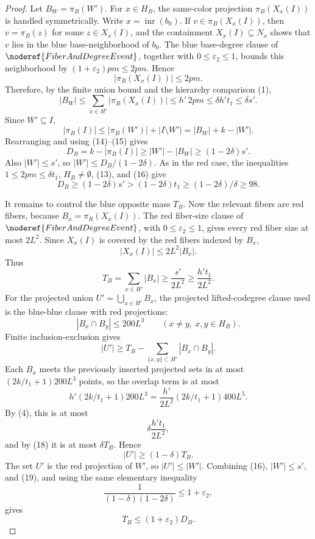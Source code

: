 \begin{proof}
Let \(B_W=\pi_B(W')\).  For \(x\in H_B\), the same-color projection
\(\pi_B(X_x(I))\) is handled symmetrically.  Write
\(x=\operatorname{inr}(b_0)\).  If \(v\in\pi_B(X_x(I))\), then
\(v=\pi_B(z)\) for some \(z\in X_x(I)\), and the containment
\(X_x(I)\subseteq N_x\) shows that \(v\) lies in the blue base-neighborhood
of \(b_0\).  The blue base-degree clause of
\(\noderef{FiberAndDegreeEvent}\), together with
\(0\le\varepsilon_2\le1\), bounds this neighborhood by
\((1+\varepsilon_2)pm\le2pm\).  Hence
\[
|\pi_B(X_x(I))|\le2pm. \tag{15a}
\]
Therefore, by the finite union bound and the hierarchy comparison (1),
\[
|B_W|
\le\sum_{x\in H'}|\pi_B(X_x(I))|
\le h'\,2pm
\le \delta h't_1
\le \delta s'. \tag{15}
\]
Since \(W'\subseteq I\),
\[
|\pi_B(I)|\le |\pi_B(W')|+|I\setminus W'|
  =|B_W|+k-|W'|.
\]
Rearranging and using (14)--(15) gives
\[
D_B=k-|\pi_B(I)|
\ge |W'|-|B_W|
\ge(1-2\delta)s'. \tag{16}
\]
Also \(|W'|\le s'\), so \(|W'|\le D_B/(1-2\delta)\).  As in the red case,
the inequalities \(1\le2pm\le\delta t_1\), \(H_B\ne\emptyset\), (13), and
(16) give
\[
D_B\ge(1-2\delta)s'>(1-2\delta)t_1
\ge(1-2\delta)/\delta\ge98. \tag{17}
\]

It remains to control the blue opposite mass \(T_B\).  Now the relevant
fibers are red fibers, because \(B_x=\pi_R(X_x(I))\).  The red fiber-size
clause of \(\noderef{FiberAndDegreeEvent}\), with
\(0\le\varepsilon_2\le1\), gives every red fiber size at most \(2L^2\).
Since \(X_x(I)\) is covered by the red fibers indexed by \(B_x\),
\[
|X_x(I)|\le2L^2|B_x|.
\]
Thus
\[
T_B=\sum_{x\in H'}|B_x|
\ge\frac{s'}{2L^2}\ge\frac{h't_1}{2L^2}. \tag{18}
\]
For the projected union \(U'=\bigcup_{x\in H'}B_x\), the projected
lifted-codegree clause used is the blue-blue clause with red projections:
\[
|B_x\cap B_y|\le200L^3
\qquad(x\ne y,\ x,y\in H_B).
\]
Finite inclusion-exclusion gives
\[
|U'|\ge T_B-\sum_{\{x,y\}\subset H'}|B_x\cap B_y|.
\]
Each \(B_x\) meets the previously inserted projected sets in at most
\((2k/t_1+1)200L^3\) points, so the overlap term is at most
\[
h'(2k/t_1+1)200L^3
=\frac{h'}{2L^2}(2k/t_1+1)400L^5.
\]
By (4), this is at most
\[
\delta\frac{h't_1}{2L^2},
\]
and by (18) it is at most \(\delta T_B\).  Hence
\[
|U'|\ge(1-\delta)T_B. \tag{19}
\]
The set \(U'\) is the red projection of \(W'\), so \(|U'|\le |W'|\).  Combining
(16), \(|W'|\le s'\), and (19), and using the same elementary inequality
\[
\frac{1}{(1-\delta)(1-2\delta)}\le1+\varepsilon_2,
\]
gives
\[
T_B\le(1+\varepsilon_2)D_B. \tag{20}
\]


\end{proof}

